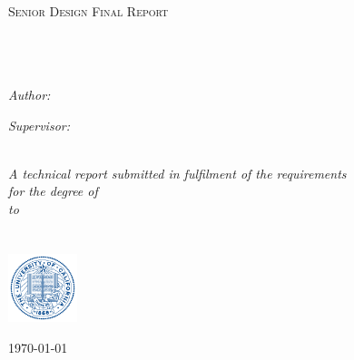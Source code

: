 \documentclass[11pt, oneside]{Thesis} %
\begin{document}
\begin{titlepage}
\begin{center}

\textsc{\LARGE \univname}\\[1.5cm] %
\textsc{\Large Senior Design Final Report }\\[0.5cm] %

\HRule \\[0.4cm] %
{\huge \bfseries \ttitle}\\[0.4cm] %
\HRule \\[1.5cm] %
 
\begin{minipage}{0.4\textwidth}
\begin{flushleft} \large
\emph{Author:}\\
\href{http://www.empireryan.com}{\authornames} %
\end{flushleft}
\end{minipage}
\begin{minipage}{0.4\textwidth}
\begin{flushright} \large
\emph{Supervisor:} \\
{\supname} %
\end{flushright}
\end{minipage}\\[3cm]
 
\large \textit{A technical report submitted in fulfilment of the requirements\\ for the degree of \degreename}\\[0.3cm] %
\textit{to}\\[0.4cm]
\groupname\\\deptname\\[2cm] %
\includegraphics[width=0.15\textwidth]{seal} %

{\large \today}\\[4cm] %
 
\vfill
\end{center}

\end{titlepage}
\end{document}
